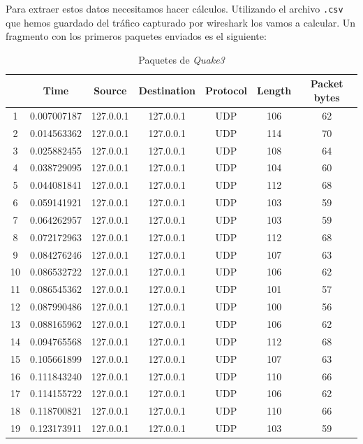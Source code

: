 \documentclass[11pt,a4paper]{article}
\begin{document}
Para extraer estos datos necesitamos hacer cálculos. Utilizando el archivo \texttt{.csv} que hemos guardado del tráfico capturado por wireshark los vamos a calcular. Un fragmento con los primeros paquetes enviados es el siguiente:

\begin{table}[H]
\centering
\begin{tabular}{|c|c|c|c|c|c|c|}
\hline
  & \textbf{Time}        & \textbf{Source}    & \textbf{Destination} & \textbf{Protocol} & \textbf{Length} & \textbf{Packet bytes} \\ \hline
1  & 0.007007187 & 127.0.0.1 & 127.0.0.1   & UDP      & 106    & 62           \\ \hline
2  & 0.014563362 & 127.0.0.1 & 127.0.0.1   & UDP      & 114    & 70           \\ \hline
3  & 0.025882455 & 127.0.0.1 & 127.0.0.1   & UDP      & 108    & 64           \\ \hline
4  & 0.038729095 & 127.0.0.1 & 127.0.0.1   & UDP      & 104    & 60           \\ \hline
5  & 0.044081841 & 127.0.0.1 & 127.0.0.1   & UDP      & 112    & 68           \\ \hline
6  & 0.059141921 & 127.0.0.1 & 127.0.0.1   & UDP      & 103    & 59           \\ \hline
7  & 0.064262957 & 127.0.0.1 & 127.0.0.1   & UDP      & 103    & 59           \\ \hline
8  & 0.072172963 & 127.0.0.1 & 127.0.0.1   & UDP      & 112    & 68           \\ \hline
9 & 0.084276246 & 127.0.0.1 & 127.0.0.1   & UDP      & 107    & 63           \\ \hline
10 & 0.086532722 & 127.0.0.1 & 127.0.0.1   & UDP      & 106    & 62           \\ \hline
11 & 0.086545362 & 127.0.0.1 & 127.0.0.1   & UDP      & 101    & 57           \\ \hline
12 & 0.087990486 & 127.0.0.1 & 127.0.0.1   & UDP      & 100    & 56           \\ \hline
13 & 0.088165962 & 127.0.0.1 & 127.0.0.1   & UDP      & 106    & 62           \\ \hline
14 & 0.094765568 & 127.0.0.1 & 127.0.0.1   & UDP      & 112    & 68           \\ \hline
15 & 0.105661899 & 127.0.0.1 & 127.0.0.1   & UDP      & 107    & 63           \\ \hline
16 & 0.111843240 & 127.0.0.1 & 127.0.0.1   & UDP      & 110    & 66           \\ \hline
17 & 0.114155722 & 127.0.0.1 & 127.0.0.1   & UDP      & 106    & 62           \\ \hline
18 & 0.118700821 & 127.0.0.1 & 127.0.0.1   & UDP      & 110    & 66           \\ \hline
19 & 0.123173911 & 127.0.0.1 & 127.0.0.1   & UDP      & 103    & 59           \\ \hline
\end{tabular}
\caption{Paquetes de \textit{Quake3}}
\end{table}
\end{document}
